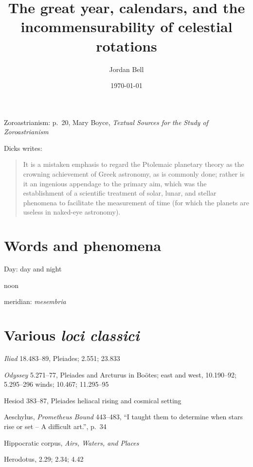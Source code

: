 \documentclass{amsart}
\theoremstyle{definition}
\begin{document}
\title[The great year]{The great year, calendars, and the incommensurability of celestial rotations}
\author{Jordan Bell}
\address{Department of Mathematics, University of Toronto, Toronto, Ontario, Canada}
\date{\today}

\maketitle

Zoroastrianism: p.~20, Mary Boyce, {\em Textual Sources for the Study of Zoroastrianism}

Dicks \cite[p.~26]{dicks} writes:

\begin{quote}
It is a mistaken emphasis to regard the Ptolemaic planetary theory as the crowning achievement of
Greek astronomy, as is commonly done; rather is it an ingenious appendage to the primary
aim, which was the establishment of a scientific treatment
of solar, lunar, and stellar phenomena to facilitate the measurement
of time (for which the planets are useless in naked-eye astronomy).
\end{quote}






\section{Words and phenomena}
Day: day and night

noon

meridian: {\em mesembria}




\section{Various {\em loci classici}}
{\em Iliad} 18.483--89, Pleiades; 2.551; 23.833

{\em Odyssey} 5.271--77, Pleiades and Arcturus in Bo\"otes; east and west, 10.190--92; 5.295--296 winds; 
10.467; 11.295--95

Hesiod 383--87, Pleiades heliacal rising and cosmical setting

Aeschylus, {\em Prometheus Bound} 443--483, ``I taught them to determine when stars rise or set -- A difficult art.'', p.~34

Hippocratic corpus, {\em Airs, Waters, and Places} 

Herodotus, 2.29; 2.34; 4.42
\end{document}
